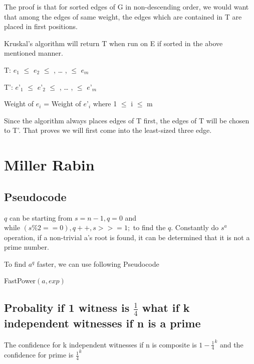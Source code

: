 \documentclass[a4paper]{article}
\begin{document}
The proof is that for sorted edges of G in non-descending order, we would want that among the edges of same weight, the edges which are contained in T are placed in first positions.

Kruskal’s algorithm will return T when run on E if sorted in the above mentioned manner.

T: $e_1$ $\leq$ $e_2$ $\leq$ , … , $\leq$ $e_m$

T’: $e’_1$ $\leq$ $e’_2$ $\leq$ , … , $\leq$ $e’_m$

Weight of $e_i$ = Weight of $e’_i$ where 1 $\leq$ i $\leq$ m

Since the algorithm always places edges of T first, the edges of T will be chosen to T’. That proves we will first come into the least-sized three edge.
\section{Miller Rabin}
\subsection{Pseudocode}
$q$ can be starting from $s=n-1,q=0$ and $\text{while }(s\%2==0),q++,s>>=1;$ to find the $q$. Constantly do $s^a$ operation, if a non-trivial a's root is found, it can be determined that it is not a prime number.

To find $a^q$ faster, we can use following Pseudocode
\begin{algorithm}
  \caption{FastPower$(a,exp)$}\label{alg:cap5}
  \begin{algorithmic}[1]
		\EndIf
		\EndIf
		\EndIf
  \end{algorithmic}
\end{algorithm}
\subsection{Probality if 1 witness is $\frac 1 4$ what if k independent witnesses if n is a prime}
The confidence for k independent witnesses if n is composite is $1-\frac {1} {4}^k$ and the confidence for prime is $\frac 1 4^k$
\end{document}
